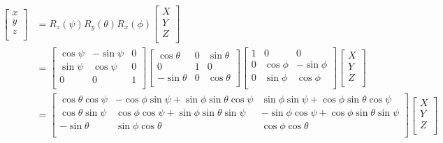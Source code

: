 \documentclass[12pt]{article}
\begin{document}
  $$
  {\displaystyle {\begin{aligned}{\begin{bmatrix}x\\y\\z\\\end{bmatrix}}&=R_{z}(\psi )R_{y}(\theta )R_{x}(\phi ){\begin{bmatrix}X\\Y\\Z\\\end{bmatrix}}\\&={\begin{bmatrix}\cos \psi &-\sin \psi &0\\\sin \psi &\cos \psi &0\\0&0&1\\\end{bmatrix}}{\begin{bmatrix}\cos \theta &0&\sin \theta \\0&1&0\\-\sin \theta &0&\cos \theta \\\end{bmatrix}}{\begin{bmatrix}1&0&0\\0&\cos \phi &-\sin \phi \\0&\sin \phi &\cos \phi \\\end{bmatrix}}{\begin{bmatrix}X\\Y\\Z\\\end{bmatrix}}\\&={\begin{bmatrix}\cos \theta \cos \psi &-\cos \phi \sin \psi +\sin \phi \sin \theta \cos \psi &\sin \phi \sin \psi +\cos \phi \sin \theta \cos \psi \\\cos \theta \sin \psi &\cos \phi \cos \psi +\sin \phi \sin \theta \sin \psi &-\sin \phi \cos \psi +\cos \phi \sin \theta \sin \psi \\-\sin \theta &\sin \phi \cos \theta &\cos \phi \cos \theta \\\end{bmatrix}}{\begin{bmatrix}X\\Y\\Z\\\end{bmatrix}}\\\end{aligned}}}
  $$
\end{document}

